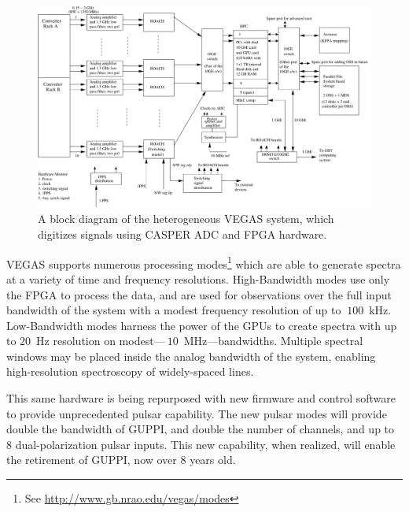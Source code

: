 \documentclass{ws-jai}
\begin{document}
\begin{figure}[htb]
 \centering
 \includegraphics[width=\textwidth]{./figures/vegas-block-90.pdf}
 \caption{A block diagram of the heterogeneous VEGAS system, which digitizes signals using CASPER ADC and FPGA hardware.}
 \label{fig:vegas}
\end{figure}


VEGAS supports numerous processing modes\footnote{See
\url{http://www.gb.nrao.edu/vegas/modes}} which are able to generate spectra at a variety of time and frequency resolutions. High-Bandwidth modes use only the FPGA to process the data, and are used for observations over the full input bandwidth of the system with a modest frequency resolution of up to $~100$~kHz. Low-Bandwidth modes harness the power of the GPUs to create spectra with up to 20~Hz resolution
on modest---$~10$~MHz---bandwidths.  Multiple spectral windows may be placed
inside the analog bandwidth of the system, enabling high-resolution
spectroscopy of widely-spaced lines.

This same hardware is being repurposed with new firmware and control
software to provide unprecedented pulsar capability.  The new pulsar
modes will provide double the bandwidth of GUPPI, and double the
number of channels, and up to 8 dual-polarization pulsar inputs.  This
new capability, when realized, will enable the retirement of GUPPI,
now over 8 years old.
\end{document}
